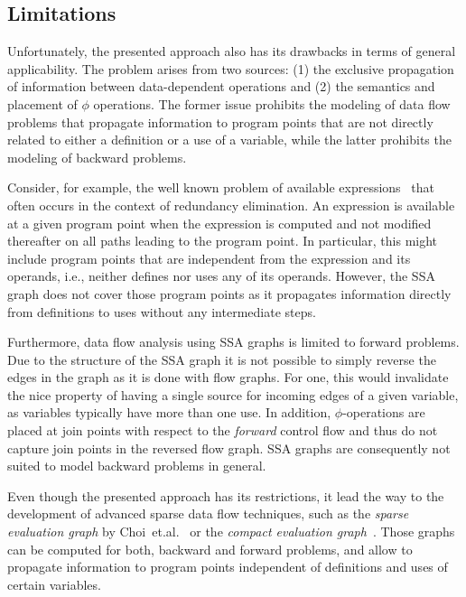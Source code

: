 \subsection{Limitations}

Unfortunately, the presented approach also has its drawbacks in terms of
general applicability. The problem arises from two sources: (1) the exclusive
propagation of information between data-dependent operations and (2) the
semantics and placement of $\phi$ operations. The former issue prohibits the
modeling of data flow problems that propagate information to program points that
are not directly related to either a definition or a use of a variable, while
the latter prohibits the modeling of backward problems.

Consider, for example, the well known problem of available
expressions~\cite{novillo:bib:NNH99} that often occurs in the context of
redundancy elimination. An expression is available at a given program point when
the expression is computed and not modified thereafter on all paths leading to
the program point. In particular, this might include program points that are
independent from the expression and its operands, i.e., neither defines nor uses
any of its operands. However, the SSA graph does not cover those program points
as it propagates information directly from definitions to uses without any
intermediate steps.

Furthermore, data flow analysis using SSA graphs is limited to forward problems.
Due to the structure of the SSA graph it is not possible to simply reverse the
edges in the graph as it is done with flow graphs. For one, this would
invalidate the nice property of having a single source for incoming edges of a
given variable, as variables typically have more than one use. In addition,
$\phi$-operations are placed at join points with respect to the \emph{forward}
control flow and thus do not capture join points in the reversed flow graph.
SSA graphs are consequently not suited to model backward problems in general.

Even though the presented approach has its restrictions, it lead the way to the
development of advanced sparse data flow techniques, such as the \emph{sparse
evaluation graph} by Choi~et.al.~\cite{novillo:bib:CCF91} or the \emph{compact
evaluation graph}~\cite{novillo:bib:R02}. Those graphs can be computed for both,
backward and forward problems, and allow to propagate information to program
points independent of definitions and uses of certain variables.

